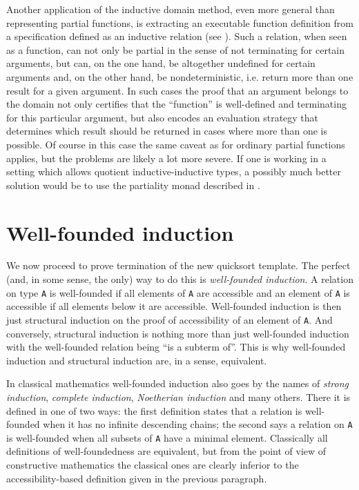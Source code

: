 \documentclass[declaration,mgr,english,shortabstract]{iithesis}
\newcommand{\m}[1]{\texttt{#1}}
\begin{document}
Another application of the inductive domain method, even more general than representing partial functions, is extracting an executable function definition from a specification defined as an inductive relation (see \cite{Function}). Such a relation, when seen as a function, can not only be partial in the sense of not terminating for certain arguments, but can, on the one hand, be altogether undefined for certain arguments and, on the other hand, be nondeterministic, i.e. return more than one result for a given argument. In such cases the proof that an argument belongs to the domain not only certifies that the ``function'' is well-defined and terminating for this particular argument, but also encodes an evaluation strategy that determines which result should be returned in cases where more than one is possible. Of course in this case the same caveat as for ordinary partial functions applies, but the problems are likely a lot more severe. If one is working in a setting which allows quotient inductive-inductive types, a possibly much better solution would be to use the partiality monad described in \cite{PartialityMonad}.

\section{Well-founded induction} \label{wellfounded}

We now proceed to prove termination of the new quicksort template. The perfect (and, in some sense, the only) way to do this is \textit{well-founded induction}. A relation on type \m{A} is well-founded if all elements of \m{A} are accessible and an element of \m{A} is accessible if all elements below it are accessible. Well-founded induction is then just structural induction on the proof of accessibility of an element of \m{A}. And conversely, structural induction is nothing more than just well-founded induction with the well-founded relation being ``is a subterm of''. This is why well-founded induction and structural induction are, in a sense, equivalent.

In classical mathematics well-founded induction also goes by the names of \textit{strong induction}, \textit{complete induction}, \textit{Noetherian induction} and many others. There it is defined in one of two ways: the first definition states that a relation is well-founded when it has no infinite descending chains; the second says a relation on \m{A} is well-founded when all subsets of \m{A} have a minimal element. Classically all definitions of well-foundedness are equivalent, but from the point of view of constructive mathematics the classical ones are clearly inferior to the accessibility-based definition given in the previous paragraph.
\end{document}
